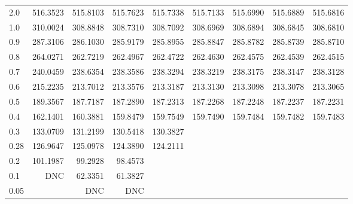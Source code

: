 \begin{landscape}
\begin{table}
\begin{center}
\begin{tabular}{l|rrrrrrrr}
2.0 & 516.3523 & 515.8103 & 515.7623 & 515.7338 & 515.7133 & 515.6990 & 515.6889 & 515.6816 \\ 
1.0 & 310.0024 & 308.8848 & 308.7310 & 308.7092 & 308.6969 & 308.6894 & 308.6845 & 308.6810 \\ 
0.9 & 287.3106 & 286.1030 & 285.9179 & 285.8955 & 285.8847 & 285.8782 & 285.8739 & 285.8710 \\ 
0.8 & 264.0271 & 262.7219 & 262.4967 & 262.4722 & 262.4630 & 262.4575 & 262.4539 & 262.4515 \\ 
0.7 & 240.0459 & 238.6354 & 238.3586 & 238.3294 & 238.3219 & 238.3175 & 238.3147 & 238.3128 \\ 
0.6 & 215.2235 & 213.7012 & 213.3576 & 213.3187 & 213.3130 & 213.3098 & 213.3078 & 213.3065 \\ 
0.5 & 189.3567 & 187.7187 & 187.2890 & 187.2313 & 187.2268 & 187.2248 & 187.2237 & 187.2231 \\ 
0.4 & 162.1401 & 160.3881 & 159.8479 & 159.7549 & 159.7490 & 159.7484 & 159.7482 & 159.7483 \\ 
0.3 & 133.0709 & 131.2199 & 130.5418 & 130.3827 &          &          &          &  \\
0.28 & 126.9647 & 125.0978 & 124.3890 & 124.2111  \\ 
0.2 & 101.1987 & 99.2928 & 98.4573 &   \\ 
0.1 & DNC & 62.3351 & 61.3827  \\ 
0.05 &         & DNC & DNC  \\
\hline \hline
\end{tabular}
\end{center}
\end{table}
\end{landscape}
 







